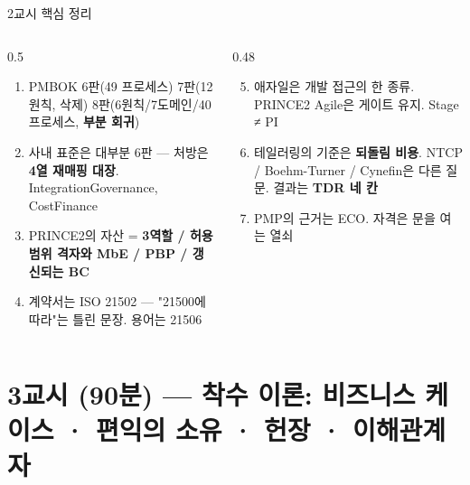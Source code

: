 \begin{frame}{2교시 핵심 정리}
\begin{columns}[T]
\begin{column}{0.5\textwidth}
\begin{enumerate}
\item PMBOK 6판(49 프로세스) \ra{} 7판(12원칙, 삭제) \ra{} 8판(6원칙/7도메인/40 프로세스, \textbf{부분 회귀})
\item 사내 표준은 대부분 6판 — 처방은 \textbf{4열 재매핑 대장}. Integration\ra{}Governance, Cost\ra{}Finance
\item PRINCE2의 자산 = \textbf{3역할 / 허용범위 격자와 MbE / PBP / 갱신되는 BC}
\item 계약서는 ISO 21502 — "21500에 따라"는 틀린 문장. 용어는 21506
\end{enumerate}
\end{column}
\begin{column}{0.48\textwidth}
\begin{enumerate}\setcounter{enumi}{4}
\item 애자일은 개발 접근의 한 종류. PRINCE2 Agile은 게이트 유지. Stage ≠ PI
\item 테일러링의 기준은 \textbf{되돌림 비용}. NTCP / Boehm-Turner / Cynefin은 다른 질문. 결과는 \textbf{TDR 네 칸}
\item PMP의 근거는 ECO. 자격은 문을 여는 열쇠
\end{enumerate}
\end{column}
\end{columns}
\end{frame}

\section{3교시 (90분) — 착수 이론: 비즈니스 케이스 · 편익의 소유 · 헌장 · 이해관계자}

